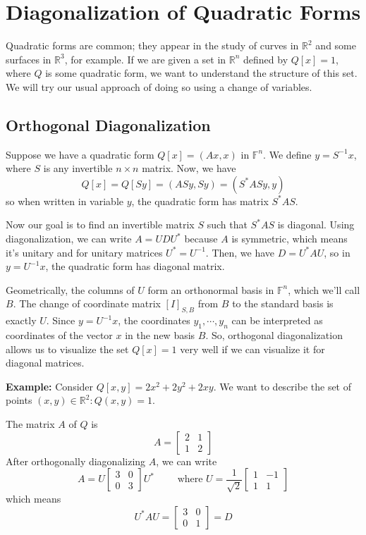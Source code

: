 \documentclass[a4paper,10pt]{book}
\newcommand{\R}{\mathbb{R}}
\newcommand{\F}{\mathbb{F}}
\theoremstyle{plain}
\theoremstyle{plain}
\theoremstyle{remark}
\theoremstyle{definition}
\begin{document}
\section{Diagonalization of Quadratic Forms}

Quadratic forms are common; they appear in the study of curves in $\R^{2}$ and some surfaces in $\R^{3}$, for example. If we are given a set in $\R^{n}$ defined by $Q[x] = 1$, where $Q$ is some quadratic form, we want to understand the structure of this set. We will try our usual approach of doing so using a change of variables. 

\subsection{Orthogonal Diagonalization}

Suppose we have a quadratic form $Q[x] = (Ax, x)$ in $\F^{n}$. We define $y = S^{-1} x$, where $S$ is any invertible $n \times n$ matrix. Now, we have
$$Q[x] = Q[Sy] = (ASy, Sy) = (S^{*} AS y, y)$$
so when written in variable $y$, the quadratic form has matrix $S^{*}AS$. 

Now our goal is to find an invertible matrix $S$ such that $S^{*} AS$ is diagonal. Using diagonalization, we can write $A = UDU^{*}$ because $A$ is symmetric, which means it's unitary and for unitary matrices $U^{*} = U^{-1}$. Then, we have $D = U^{*} AU$, so in $y = U^{-1} x$, the quadratic form has diagonal matrix. 

Geometrically, the columns of $U$ form an orthonormal basis in $\F^{n}$, which we'll call $B$. The change of coordinate matrix $[I]_{S, B}$ from $B$ to the standard basis is exactly $U$. Since $y = U^{-1} x$, the coordinates $y_{1}, \cdots, y_{n}$ can be interpreted as coordinates of the vector $x$ in the new basis $B$. So, orthogonal diagonalization allows us to visualize the set $Q[x] = 1$ very well if we can visualize it for diagonal matrices. 

\textbf{Example:} Consider $Q[x, y] = 2x^{2} + 2y^{2} + 2xy$. We want to describe the set of points $(x, y) \in \R^{2} : Q(x, y) = 1$. 

The matrix $A$ of $Q$ is 
$$A = \begin{bmatrix}
2 & 1 \\
1 & 2
\end{bmatrix}$$ 
After orthogonally diagonalizing $A$, we can write 
$$A = U \begin{bmatrix}
3 & 0 \\
0 & 3
\end{bmatrix} U^{*} \qquad \text{ where } U = \frac{1}{\sqrt{2}} \begin{bmatrix}
1 & -1 \\
1 & 1
\end{bmatrix}$$
which means
$$U^{*} AU = \begin{bmatrix}
3 & 0 \\
0 & 1
\end{bmatrix} = D$$
\end{document}
